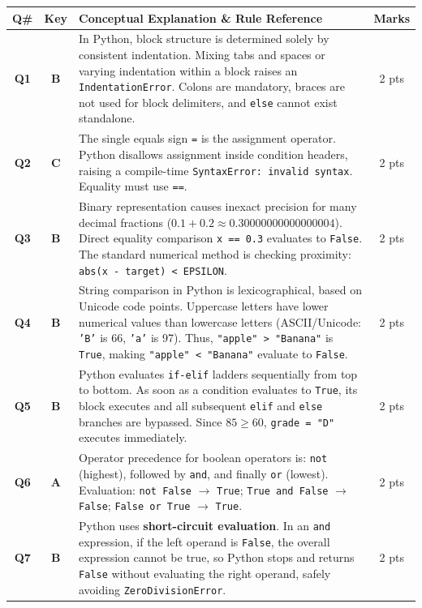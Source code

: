 \documentclass[11pt,a4paper]{article}
\begin{document}
\begin{center}
\renewcommand{\arraystretch}{1.35}
\begin{tabularx}{\textwidth}{|c|c|X|c|}
\hline
\textbf{Q\#} & \textbf{Key} & \textbf{Conceptual Explanation \& Rule Reference} & \textbf{Marks} \\
\hline
\textbf{Q1} & \textbf{B} & In Python, block structure is determined solely by consistent indentation. Mixing tabs and spaces or varying indentation within a block raises an \texttt{IndentationError}. Colons are mandatory, braces are not used for block delimiters, and \texttt{else} cannot exist standalone. & 2 pts \\
\hline
\textbf{Q2} & \textbf{C} & The single equals sign \texttt{=} is the assignment operator. Python disallows assignment inside condition headers, raising a compile-time \texttt{SyntaxError: invalid syntax}. Equality must use \texttt{==}. & 2 pts \\
\hline
\textbf{Q3} & \textbf{B} & Binary representation causes inexact precision for many decimal fractions ($0.1 + 0.2 \approx 0.30000000000000004$). Direct equality comparison \texttt{x == 0.3} evaluates to \texttt{False}. The standard numerical method is checking proximity: \texttt{abs(x - target) < EPSILON}. & 2 pts \\
\hline
\textbf{Q4} & \textbf{B} & String comparison in Python is lexicographical, based on Unicode code points. Uppercase letters have lower numerical values than lowercase letters (ASCII/Unicode: \texttt{'B'} is 66, \texttt{'a'} is 97). Thus, \texttt{"apple" > "Banana"} is \texttt{True}, making \texttt{"apple" < "Banana"} evaluate to \texttt{False}. & 2 pts \\
\hline
\textbf{Q5} & \textbf{B} & Python evaluates \texttt{if-elif} ladders sequentially from top to bottom. As soon as a condition evaluates to \texttt{True}, its block executes and all subsequent \texttt{elif} and \texttt{else} branches are bypassed. Since $85 \ge 60$, \texttt{grade = "D"} executes immediately. & 2 pts \\
\hline
\textbf{Q6} & \textbf{A} & Operator precedence for boolean operators is: \texttt{not} (highest), followed by \texttt{and}, and finally \texttt{or} (lowest). Evaluation: \texttt{not False} $\rightarrow$ \texttt{True}; \texttt{True and False} $\rightarrow$ \texttt{False}; \texttt{False or True} $\rightarrow$ \texttt{True}. & 2 pts \\
\hline
\textbf{Q7} & \textbf{B} & Python uses \textbf{short-circuit evaluation}. In an \texttt{and} expression, if the left operand is \texttt{False}, the overall expression cannot be true, so Python stops and returns \texttt{False} without evaluating the right operand, safely avoiding \texttt{ZeroDivisionError}. & 2 pts \\

\end{tabularx}
\end{center}
\end{document}
